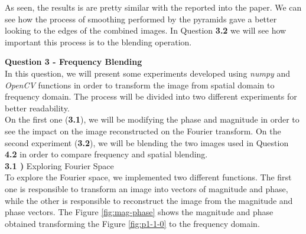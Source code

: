 \documentclass[12pt,a4paper]{article}
\begin{document}
As seen, the results is are pretty similar with the reported into the paper. We can see how the process of smoothing performed by the pyramids gave a better looking to the edges of the combined images. In Question \textbf{3.2} we will see how important this process is to the blending operation. 

\newpage

\textbf{\LARGE Question 3 - Frequency Blending} \\

In this question, we will present some experiments developed using \emph{numpy} and \emph{OpenCV} functions in order to transform the image from spatial domain to frequency domain. The process will be divided into two different experiments for better readability. \\

On the first one (\textbf{3.1}), we will be modifying the phase and magnitude in order to see the impact on the image reconstructed on the Fourier transform. On the second experiment (\textbf{3.2}), we will be blending the two images used in Question \textbf{4.2} in order to compare frequency and spatial blending. \\

\textbf{3.1 )} Exploring Fourier Space \\

To explore the Fourier space, we implemented two different functions. The first one is responsible to transform an image into vectors of magnitude and phase, while the other is responsible to reconstruct the image from the magnitude and phase vectors. The Figure \ref{fig:mag-phase} shows the magnitude and phase obtained transforming the Figure \ref{fig:p1-1-0} to the frequency domain. \\
\end{document}
